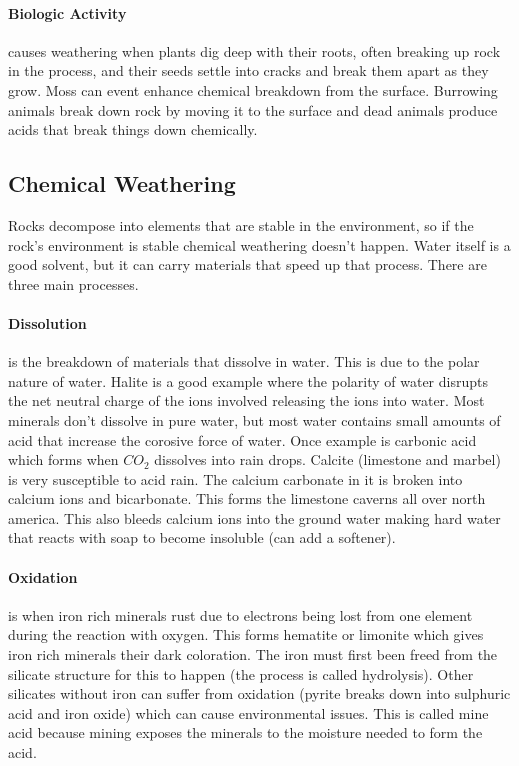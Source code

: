 \documentclass{article}
\begin{document}
\paragraph{Biologic Activity} %
\label{par:biologic_activity}
causes weathering when plants dig deep with their roots, often breaking up rock in the process, and their seeds settle into cracks and break them apart as they grow. Moss can event enhance chemical breakdown from the surface. Burrowing animals break down rock by moving it to the surface and dead animals produce acids that break things down chemically.

\subsection*{Chemical Weathering} %
\label{sub:chemical_weathering}
Rocks decompose into elements that are stable in the environment, so if the rock's environment is stable chemical weathering doesn't happen. Water itself is a good solvent, but it can carry materials that speed up that process. There are three main processes.

\paragraph{Dissolution} %
\label{par:dissolution}
is the breakdown of materials that dissolve in water. This is due to the polar nature of water. Halite is a good example where the polarity of water disrupts the net neutral charge of the ions involved releasing the ions into water. Most minerals don't dissolve in pure water, but most water contains small amounts of acid that increase the corosive force of water. Once example is carbonic acid which forms when $CO_2$ dissolves into rain drops. Calcite (limestone and marbel) is very susceptible to acid rain. The calcium carbonate in it is broken into calcium ions and bicarbonate. This forms the limestone caverns all over north america. This also bleeds calcium ions into the ground water making hard water that reacts with soap to become insoluble (can add a softener).

\paragraph{Oxidation} %
\label{par:oxidation}
is when iron rich minerals rust due to electrons being lost from one element during the reaction with oxygen.  This forms hematite or limonite which gives iron rich minerals their dark coloration. The iron must first been freed from the silicate structure for this to happen (the process is called hydrolysis). Other silicates without iron can suffer from oxidation (pyrite breaks down into sulphuric acid and iron oxide) which can cause environmental issues. This is called mine acid because mining exposes the minerals to the moisture needed to form the acid.
\end{document}
